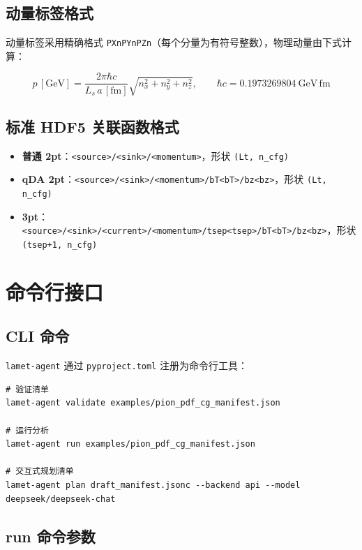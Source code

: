 \documentclass[12pt,a4paper]{ctexart}
\begin{document}
\subsection{动量标签格式}

动量标签采用精确格式 \texttt{PXnPYnPZn}（每个分量为有符号整数），物理动量由下式计算：

\[
p\,[\mathrm{GeV}] = \frac{2\pi\hbar c}{L_s\,a\,[\mathrm{fm}]} \sqrt{n_x^2+n_y^2+n_z^2},
\qquad \hbar c = 0.1973269804\ \mathrm{GeV\,fm}
\]

\subsection{标准 HDF5 关联函数格式}

\begin{itemize}[itemsep=3pt]
    \item \textbf{普通 2pt}：\texttt{<source>/<sink>/<momentum>}，形状 \texttt{(Lt, n\_cfg)}
    \item \textbf{qDA 2pt}：\texttt{<source>/<sink>/<momentum>/bT<bT>/bz<bz>}，形状 \texttt{(Lt, n\_cfg)}
    \item \textbf{3pt}：\texttt{<source>/<sink>/<current>/<momentum>/tsep<tsep>/bT<bT>/bz<bz>}，形状 \texttt{(tsep+1, n\_cfg)}
\end{itemize}

\section{命令行接口}

\subsection{CLI 命令}

\texttt{lamet-agent} 通过 \texttt{pyproject.toml} 注册为命令行工具：

\begin{lstlisting}[style=bashcode]
# 验证清单
lamet-agent validate examples/pion_pdf_cg_manifest.json

# 运行分析
lamet-agent run examples/pion_pdf_cg_manifest.json

# 交互式规划清单
lamet-agent plan draft_manifest.jsonc --backend api --model deepseek/deepseek-chat
\end{lstlisting}

\subsection{run 命令参数}
\end{document}
